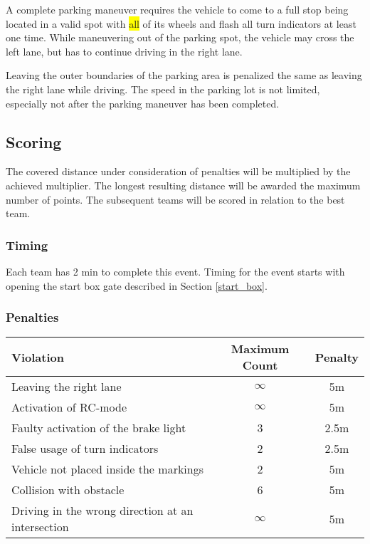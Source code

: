 A complete parking maneuver requires the vehicle to come to a full stop being
located in a valid spot with \colorbox{yellow}{all} of its wheels and flash all turn
indicators at least one time. While maneuvering out of the parking spot, the
vehicle may cross the left lane, but has to continue driving in the right lane.

Leaving the outer boundaries of the parking area is penalized the same as
leaving the right lane while driving. The speed in the parking lot is not
limited, especially not after the parking maneuver has been completed.

\subsection{Scoring}
\label{freedrive_scoring}

The covered distance under consideration of penalties will be multiplied by the
achieved multiplier. The longest resulting distance will be awarded the maximum
number of points. The subsequent teams will be scored in relation to the best
team.

\subsubsection{Timing}

Each team has 2 min to complete this event. Timing for the event starts with
opening the start box gate described in Section \ref{start_box}.

\subsubsection{Penalties}
\label{freedrive_penalties}

\begin{table}[H]
	\begin{tabular}{@{}lcc@{}}
		\toprule
		\textbf{Violation}                                & \textbf{Maximum Count} & \textbf{Penalty} \\ \midrule
		Leaving the right lane                            & $\infty$               & 5m               \\
		Activation of RC-mode                             & $\infty$               & 5m               \\
		Faulty activation of the brake light              & 3                      & 2.5m             \\
		False usage of turn indicators                    & 2                      & 2.5m             \\
		Vehicle not placed inside the markings            & 2                      & 5m               \\
		Collision with obstacle                           & 6                      & 5m               \\
		Driving in the wrong direction at an intersection & $\infty$               & 5m               \\
		\bottomrule
	\end{tabular}
\end{table}

